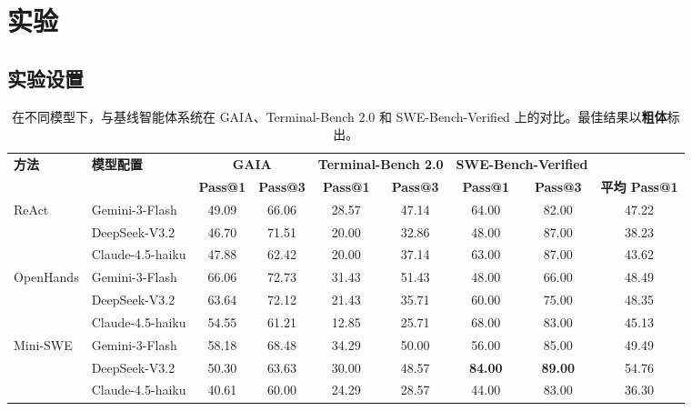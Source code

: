 \section{实验}

\subsection{实验设置}

\begin{table}[!t]
\centering
\small
\setlength{\tabcolsep}{5pt}
\renewcommand{\arraystretch}{1.1}
\begin{threeparttable}
\caption{在不同模型下，\our 与基线智能体系统在 GAIA、Terminal-Bench 2.0 和 SWE-Bench-Verified 上的对比。最佳结果以\textbf{粗体}标出。}
\label{tab:main_results}
\begin{tabular}{l l cc cc cc c}
\toprule
\textbf{方法} & \textbf{模型配置}
& \multicolumn{2}{c}{\textbf{GAIA}}
& \multicolumn{2}{c}{\textbf{Terminal-Bench 2.0}}
& \multicolumn{2}{c}{\textbf{SWE-Bench-Verified}}
\\
\cmidrule(lr){3-4}\cmidrule(lr){5-6}\cmidrule(lr){7-8}
&
& \textbf{Pass@1} & \textbf{Pass@3}
& \textbf{Pass@1} & \textbf{Pass@3}
& \textbf{Pass@1} & \textbf{Pass@3}
& \textbf{平均 Pass@1}\\
\midrule

\multirow[c]{3}{*}{ReAct}
& Gemini-3-Flash     & 49.09 & 66.06 & 28.57 & 47.14 & 64.00 & 82.00 & 47.22 \\
& DeepSeek-V3.2      & 46.70 & 71.51 & 20.00 & 32.86 & 48.00 & 87.00 & 38.23 \\
& Claude-4.5-haiku   & 47.88 & 62.42 & 20.00 & 37.14 & 63.00 & 87.00 & 43.62 \\
\cmidrule(lr){1-9}

\multirow[c]{3}{*}{OpenHands}
& Gemini-3-Flash     & 66.06 & 72.73 & 31.43 & 51.43 & 48.00 & 66.00 & 48.49 \\
& DeepSeek-V3.2      & 63.64 & 72.12 & 21.43 & 35.71 & 60.00 & 75.00 & 48.35 \\
& Claude-4.5-haiku   & 54.55 & 61.21 & 12.85 & 25.71 & 68.00 & 83.00 & 45.13 \\
\cmidrule(lr){1-9}

\multirow[c]{3}{*}{Mini-SWE}
& Gemini-3-Flash     & 58.18 & 68.48 & 34.29 & 50.00 & 56.00 & 85.00 & 49.49 \\
& DeepSeek-V3.2      & 50.30 & 63.63 & 30.00 & 48.57 & \textbf{84.00} & \textbf{89.00} & 54.76 \\
& Claude-4.5-haiku   & 40.61 & 60.00 & 24.29 & 28.57 & 44.00 & 83.00 & 36.30 \\
\cmidrule(lr){1-9}


\end{tabular}
\end{threeparttable}
\end{table}
